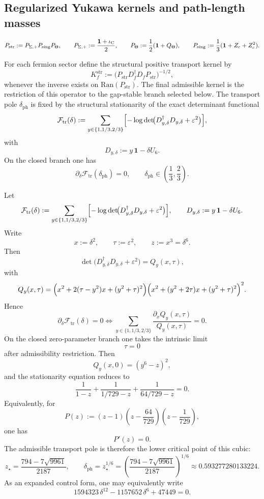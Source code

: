 \subsection{Regularized Yukawa kernels and path-length masses}

\[
P_{\mathrm{str}}:=P_{\Sigma,+}P_{\mathrm{sing}}P_\Theta,
\qquad
P_{\Sigma,+}:=\frac{\mathbf 1+\iota_{\mathrm C}}{2},
\qquad
P_\Theta:=\frac12(\mathbf 1+Q_\Theta),
\qquad
P_{\mathrm{sing}}:=\frac13(\mathbf 1+Z_c+Z_c^2).
\]

\begin{definition}
\label{def:structural-transport-kernel}
For each fermion sector define the structural positive transport kernel by
\[
K_f^{\mathrm{str}}:=\bigl(P_{\mathrm{str}} D_f^\dagger D_f P_{\mathrm{str}}\bigr)^{-1/2},
\]
whenever the inverse exists on $\mathrm{Ran}(P_{\mathrm{str}})$. The final admissible kernel is
the restriction of this operator to the gap-stable branch selected below. The transport pole
$\delta_{\mathrm{ph}}$ is fixed by the structural stationarity of the exact determinant functional
\[
\mathcal F_{\mathrm{tr}}(\delta)
:=
\sum_{y\in\{1,1/3,2/3\}}
\Bigl[-\log\det\!\bigl(D_{y,\delta}^\dagger D_{y,\delta}+\varepsilon^2\bigr)\Bigr],
\]
with
\[
D_{y,\delta}:=y\,\mathbf 1-\delta U_6.
\]
On the closed branch one has
\begin{equation}
\label{eq:transport-bridge-offset}
\partial_\delta \mathcal F_{\mathrm{tr}}(\delta_{\mathrm{ph}})=0,
\qquad
\delta_{\mathrm{ph}}\in\left(\frac13,\frac23\right).
\end{equation}
\end{definition}

\begin{theorem}
\label{prop:closed-form-transport-pole}
\label{thm:algebraic-transport-pole}
\label{thm:transport-pole-algebraic}
Let
\[
\mathcal F_{\mathrm{tr}}(\delta)
:=
\sum_{y\in\{1,1/3,2/3\}}
\Bigl[-\log\det\!\bigl(D_{y,\delta}^\dagger D_{y,\delta}+\varepsilon^2\bigr)\Bigr],
\qquad
D_{y,\delta}:=y\,\mathbf 1-\delta U_6.
\]
Write
\[
x:=\delta^2,
\qquad
\tau:=\varepsilon^2,
\qquad
z:=x^3=\delta^6.
\]
Then
\[
\det\!\bigl(D_{y,\delta}^\dagger D_{y,\delta}+\varepsilon^2\bigr)
=
Q_y(x,\tau),
\]
with
\[
Q_y(x,\tau)
=
\Bigl(x^2+2(\tau-y^2)x+(y^2+\tau)^2\Bigr)
\Bigl(x^2+(y^2+2\tau)x+(y^2+\tau)^2\Bigr)^2.
\]
Hence
\[
\partial_\delta \mathcal F_{\mathrm{tr}}(\delta)=0
\iff
\sum_{y\in\{1,1/3,2/3\}}
\frac{\partial_x Q_y(x,\tau)}{Q_y(x,\tau)}=0.
\]
On the closed zero-parameter branch one takes the intrinsic limit
\[
\tau=0
\]
after admissibility restriction. Then
\[
Q_y(x,0)=(y^6-z)^2,
\]
and the stationarity equation reduces to
\[
\frac{1}{1-z}
+
\frac{1}{1/729-z}
+
\frac{1}{64/729-z}
=0.
\]
Equivalently, for
\[
P(z):=
(z-1)\left(z-\frac{64}{729}\right)\left(z-\frac{1}{729}\right),
\]
one has
\[
P'(z)=0.
\]
The admissible transport pole is therefore the lower critical point of this cubic:
\[
z_\star
=
\frac{794-7\sqrt{9961}}{2187},
\qquad
\delta_{\mathrm{ph}}=z_\star^{1/6}
=
\left(\frac{794-7\sqrt{9961}}{2187}\right)^{1/6}
\approx \num{0.593277280133224}.
\]
As an expanded control form, one may equivalently write
\[
1594323\,\delta^{12}-1157652\,\delta^6+47449=0.
\]
\end{theorem}

